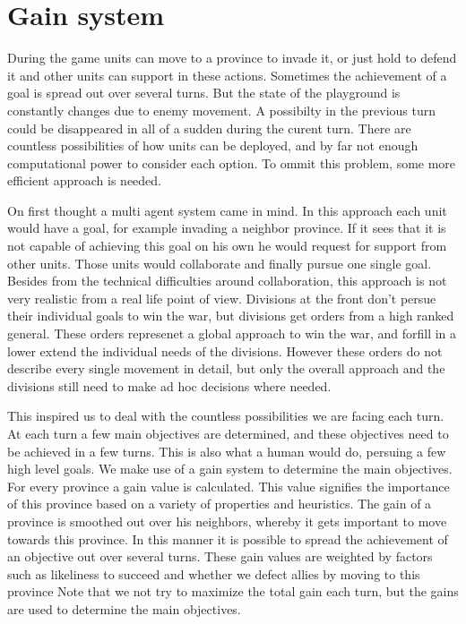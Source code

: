 \documentclass[a4paper]{article} %
\begin{document}
\section{Gain system}

During the game units can move to a province to invade it, or just hold to defend it and other units can support in these actions. Sometimes the achievement of a goal is spread out over several turns. But the state of the playground is constantly changes due to enemy movement. A possibilty in the previous turn could be disappeared in all of a sudden during the curent turn. There are countless possibilities of how units can be deployed, and by far not enough computational power to consider each option. To ommit this problem, some more efficient approach is needed. 

On first thought a multi agent system came in mind. In this approach each unit would have a goal, for example invading a neighbor province. If it sees that it is not capable of achieving this goal on his own he would request for support from other units. Those units would collaborate and finally pursue one single goal. Besides from the technical difficulties around collaboration, this approach is not very realistic from a real life point of view. Divisions at the front don't persue their individual goals to win the war, but divisions get orders from a high ranked general. These orders represenet a global approach to win the war, and forfill in a lower extend the individual needs of the divisions. However these orders do not describe every single movement in detail, but only the overall approach and the divisions still need to make ad hoc decisions where needed.

This inspired us to deal with the countless possibilities we are facing each turn. At each turn a few main objectives are determined, and these objectives need to be achieved in a few turns. This is also what a human would do, persuing a few high level goals.  
We make use of a gain system to determine the main objectives. For every province a gain value is calculated. This value signifies the importance of this province based on a variety of properties and heuristics. The gain of a province is smoothed out over his neighbors, whereby it gets important to move towards this province. In this manner it is possible to spread the achievement of an objective out over several turns.  
These gain values are weighted by factors such as likeliness to succeed and whether we defect allies by moving to this province
Note that we not try to maximize the total gain each turn, but the gains are used to determine the main objectives.  
\end{document}
